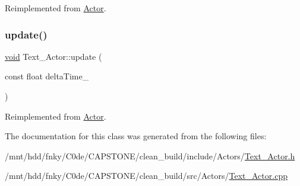 Reimplemented from \hyperlink{classActor_a47101d6275509662bf6c84c3f3439696}{Actor}.

\mbox{\label{classText__Actor_a26181e1102ab2a37ec8b140c999a6f6a}} 
\subsubsection{\texorpdfstring{update()}{update()}}
{\footnotesize\ttfamily \hyperlink{imgui__impl__opengl3__loader_8h_ac668e7cffd9e2e9cfee428b9b2f34fa7}{void} Text\+\_\+\+Actor\+::update (\begin{DoxyParamCaption}\item[{const float}]{delta\+Time\+\_\+ }\end{DoxyParamCaption})\hspace{0.3cm}{\ttfamily [virtual]}}



Reimplemented from \hyperlink{classActor_a724ff8f2e9c34f15a6c443a3912504c4}{Actor}.



The documentation for this class was generated from the following files\+:\begin{DoxyCompactItemize}
\item 
/mnt/hdd/fnky/\+C0de/\+C\+A\+P\+S\+T\+O\+N\+E/clean\+\_\+build/include/\+Actors/\hyperlink{Text__Actor_8h}{Text\+\_\+\+Actor.\+h}\item 
/mnt/hdd/fnky/\+C0de/\+C\+A\+P\+S\+T\+O\+N\+E/clean\+\_\+build/src/\+Actors/\hyperlink{Text__Actor_8cpp}{Text\+\_\+\+Actor.\+cpp}\end{DoxyCompactItemize}
